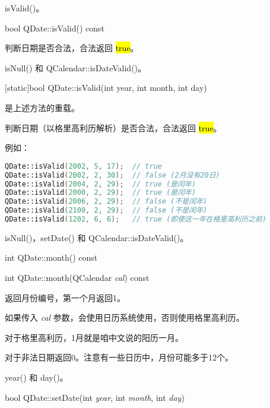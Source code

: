 \begin{notice}[另请参阅]
isValid()。
\end{notice}

\splitLine

bool QDate::isValid() const

判断日期是否合法，合法返回 \hl{true}。



\begin{notice}[另请参阅]
isNull() 和 QCalendar::isDateValid()。
\end{notice}

\splitLine

[static]bool QDate::isValid(int year, int month, int day)

是上述方法的重载。

判断日期（以格里高利历解析）是否合法，合法返回 \hl{true}。

例如：

\begin{lstlisting}[language=C++]
QDate::isValid(2002, 5, 17);  // true
QDate::isValid(2002, 2, 30);  // false (2月没有20日)
QDate::isValid(2004, 2, 29);  // true (是闰年)
QDate::isValid(2000, 2, 29);  // true (是闰年)
QDate::isValid(2006, 2, 29);  // false (不是闰年)
QDate::isValid(2100, 2, 29);  // false (不是闰年)
QDate::isValid(1202, 6, 6);   // true (即使这一年在格里高利历之前)
\end{lstlisting}


\begin{notice}[另请参阅]
isNull()，setDate() 和 QCalendar::isDateValid()。
\end{notice}

\splitLine

int QDate::month() const

int QDate::month(QCalendar \emph{cal}) const

返回月份编号，第一个月返回1。

如果传入 \emph{cal} 参数，会使用日历系统使用，否则使用格里高利历。

对于格里高利历，1月就是咱中文说的阳历一月。

对于非法日期返回0。注意有一些日历中，月份可能多于12个。



\begin{notice}[另请参阅]
 year() 和 day()。
\end{notice}

\splitLine

bool QDate::setDate(int \emph{year}, int  \emph{month}, int \emph{day})

